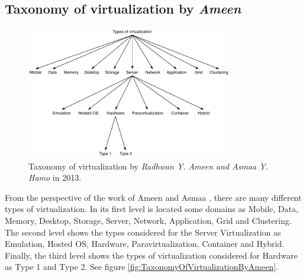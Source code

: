 	\subsection{Taxonomy of virtualization by \textit{Ameen}}
	
	\begin{figure}[!hbtp]
		\centering
		\includegraphics[width=9cm]{images/AmeenAndHamo2003.pdf}
		\vspace{-0.2cm}
		\caption{Taxonomy of virtualization by \textit{Radhwan Y. Ameen and Asmaa Y. Hamo} in 2013\footnotemark[200]{}.}
		\label{fig:TaxonomyOfVirtualizationBugnion}
	\end{figure}
	

    From the perspective of the work of Ameen and Asmaa \cite{Ameen2013}, there are many different types of virtualization. In its first level is located some domains as  Mobile, Data, Memory, Desktop, Storage, Server, Network, Application, Grid and Clustering. The second level shows the types considered for the Server Virtualization as Emulation, Hosted OS, Hardware, Paravirtualization, Container and Hybrid. Finally, the third level shows the types of virtualization considered for Hardware as Type 1 and Type 2. See figure \ref{fig:TaxonomyOfVirtualizationByAmeen}.
  
